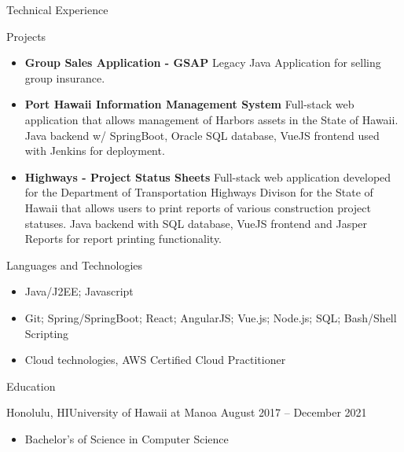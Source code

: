 \documentclass[]{mcdowellcv}
\begin{document}
	\begin{cvsection}{Technical Experience}
		\begin{cvsubsection}{Projects}{}{}
			\begin{itemize}
				\item \textbf{Group Sales Application - GSAP} Legacy Java Application for selling group insurance.
				\item \textbf{Port Hawaii Information Management System} Full-stack web application that allows management of Harbors assets in the State of Hawaii. Java backend w/ SpringBoot, Oracle SQL database, VueJS frontend used with Jenkins for deployment.
				\item \textbf{Highways - Project Status Sheets} Full-stack web application developed for the Department of Transportation Highways Divison for the State of Hawaii that allows users to print reports of various construction project statuses. Java backend with SQL database, VueJS frontend and Jasper Reports for report printing functionality.
			\end{itemize}
		\end{cvsubsection}
	\end{cvsection}
	
	\begin{cvsection}{Languages and Technologies}
		\begin{cvsubsection}{}{}{}	
			\begin{itemize}
				\item Java/J2EE; Javascript
				\item Git; Spring/SpringBoot; React; AngularJS; Vue.js; Node.js; SQL; Bash/Shell Scripting
				\item Cloud technologies, AWS Certified Cloud Practitioner
			\end{itemize}
		\end{cvsubsection}
	\end{cvsection}

	\begin{cvsection}{Education}
		\begin{cvsubsection}{Honolulu, HI}{University of Hawaii at Manoa }{August 2017 -- December 2021}
			\begin{itemize}
				\item Bachelor's of Science in Computer Science
			\end{itemize}
		\end{cvsubsection}
	\end{cvsection}

	
\end{document}
